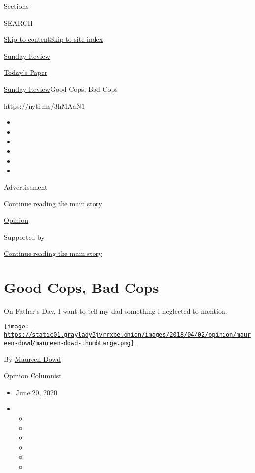 Sections

SEARCH

\protect\hyperlink{site-content}{Skip to
content}\protect\hyperlink{site-index}{Skip to site index}

\href{https://www.nytimes3xbfgragh.onion/section/opinion/sunday}{Sunday
Review}

\href{https://myaccount.nytimes3xbfgragh.onion/auth/login?response_type=cookie\&client_id=vi}{}

\href{https://www.nytimes3xbfgragh.onion/section/todayspaper}{Today's
Paper}

\href{/section/opinion/sunday}{Sunday Review}\textbar{}Good Cops, Bad
Cops

\href{https://nyti.ms/3hMAaN1}{https://nyti.ms/3hMAaN1}

\begin{itemize}
\item
\item
\item
\item
\item
\item
\end{itemize}

Advertisement

\protect\hyperlink{after-top}{Continue reading the main story}

\href{/section/opinion}{Opinion}

Supported by

\protect\hyperlink{after-sponsor}{Continue reading the main story}

\hypertarget{good-cops-bad-cops}{%
\section{Good Cops, Bad Cops}\label{good-cops-bad-cops}}

On Father's Day, I want to tell my dad something I neglected to mention.

\href{https://www.nytimes3xbfgragh.onion/by/maureen-dowd}{\texttt{[image: https://static01.graylady3jvrrxbe.onion/images/2018/04/02/opinion/maureen-dowd/maureen-dowd-thumbLarge.png]}}

By \href{https://www.nytimes3xbfgragh.onion/by/maureen-dowd}{Maureen
Dowd}

Opinion Columnist

\begin{itemize}
\item
  June 20, 2020
\item
  \begin{itemize}
  \item
  \item
  \item
  \item
  \item
  \item
  \end{itemize}
\end{itemize}

